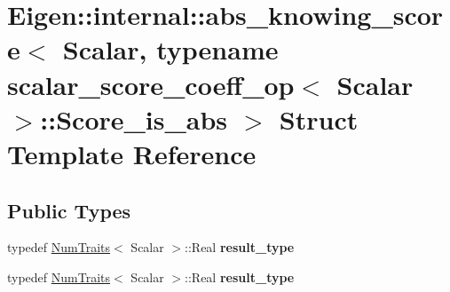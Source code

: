 \hypertarget{struct_eigen_1_1internal_1_1abs__knowing__score_3_01_scalar_00_01typename_01scalar__score__coeff5c3b449f8772ed2666062ac71b9807cd}{}\section{Eigen\+:\+:internal\+:\+:abs\+\_\+knowing\+\_\+score$<$ Scalar, typename scalar\+\_\+score\+\_\+coeff\+\_\+op$<$ Scalar $>$\+:\+:Score\+\_\+is\+\_\+abs $>$ Struct Template Reference}
\label{struct_eigen_1_1internal_1_1abs__knowing__score_3_01_scalar_00_01typename_01scalar__score__coeff5c3b449f8772ed2666062ac71b9807cd}
\subsection*{Public Types}
\begin{DoxyCompactItemize}
\item 
\mbox{\label{struct_eigen_1_1internal_1_1abs__knowing__score_3_01_scalar_00_01typename_01scalar__score__coeff5c3b449f8772ed2666062ac71b9807cd_a56c4384e0a6242d2759f34a74e067785}} 
typedef \hyperlink{group___core___module_struct_eigen_1_1_num_traits}{Num\+Traits}$<$ Scalar $>$\+::Real {\bfseries result\+\_\+type}
\item 
\mbox{\label{struct_eigen_1_1internal_1_1abs__knowing__score_3_01_scalar_00_01typename_01scalar__score__coeff5c3b449f8772ed2666062ac71b9807cd_a56c4384e0a6242d2759f34a74e067785}} 
typedef \hyperlink{group___core___module_struct_eigen_1_1_num_traits}{Num\+Traits}$<$ Scalar $>$\+::Real {\bfseries result\+\_\+type}
\end{DoxyCompactItemize}
